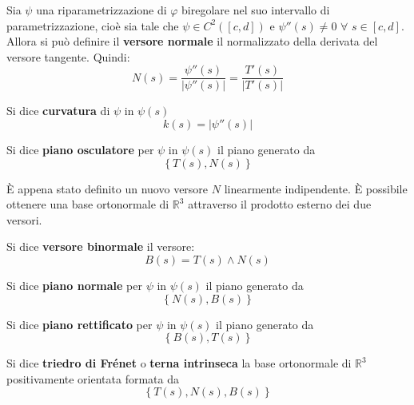 \begin{definition}
    Sia $\psi$ una riparametrizzazione di $\varphi$ biregolare nel suo intervallo di parametrizzazione, cioè sia tale che $\psi \in C^2([c,d])$ e $\psi''(s) \neq 0$ $\forall$ $s \in [c,d]$. Allora si può definire il \textbf{versore normale} il normalizzato della derivata del versore tangente. Quindi:
    \begin{equation}
        N(s)=\frac{\psi''(s)}{|\psi''(s)|}=\frac{T'(s)}{|T'(s)|}
    \end{equation}
\end{definition}
\begin{definition}
    Si dice \textbf{curvatura} di $\psi$ in $\psi(s)$ 
    \begin{equation}
        k(s)= |\psi''(s)|
    \end{equation}
\end{definition}
\begin{definition}
    Si dice \textbf{piano osculatore} per $\psi$ in $\psi(s)$ il piano generato da 
    \begin{equation}
        \left\{T(s), N(s)\right\}
    \end{equation} 
\end{definition}
È appena stato definito un nuovo versore $N$ linearmente indipendente. È possibile ottenere una base ortonormale di $\mathbb{R}^3$ attraverso il prodotto esterno dei due versori.
\begin{definition}
    Si dice \textbf{versore binormale} il versore:
    \begin{equation}
        B(s)=T(s) \wedge N(s)
    \end{equation}
\end{definition}
\begin{definition}
    Si dice \textbf{piano normale} per $\psi$ in $\psi(s)$ il piano generato da
    \begin{equation}
        \left\{N(s), B(s)\right\}
    \end{equation}
\end{definition}
\begin{definition}
    Si dice \textbf{piano rettificato} per $\psi$ in $\psi(s)$ il piano generato da
    \begin{equation}
        \left\{ B(s), T(s) \right\}
    \end{equation}
\end{definition}
\begin{definition}
    Si dice \textbf{triedro di Frénet} o \textbf{terna intrinseca} la base ortonormale di $\mathbb{R}^3$ positivamente orientata formata da
    \begin{equation}
        \left\{T(s), N(s), B(s)\right\}
    \end{equation}
\end{definition}
